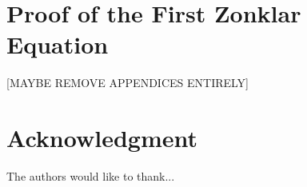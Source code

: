 \documentclass[apa6]{IEEEtran}
\theoremstyle{plain}
\begin{document}

%


\appendices
\section{Proof of the First Zonklar Equation}
[MAYBE REMOVE APPENDICES ENTIRELY]

\section*{Acknowledgment}


The authors would like to thank...


\ifCLASSOPTIONcaptionsoff
  \newpage
\fi




\end{document}
